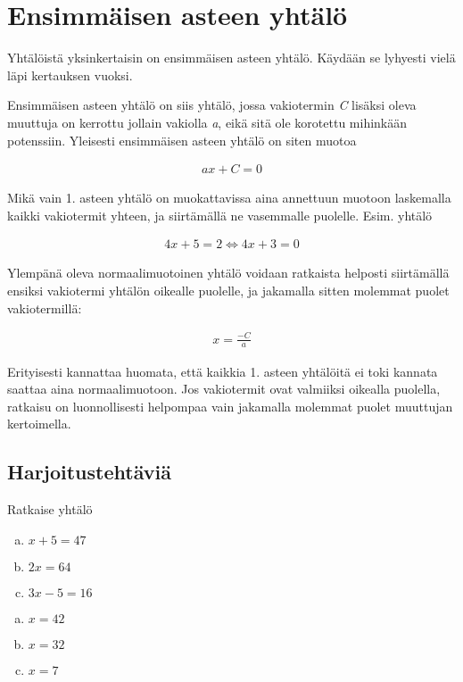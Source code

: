 \chapter{Ensimmäisen asteen yhtälö}

Yhtälöistä yksinkertaisin on ensimmäisen asteen yhtälö. Käydään se lyhyesti
vielä läpi kertauksen vuoksi.

Ensimmäisen asteen yhtälö on siis yhtälö, jossa vakiotermin \emph{C} lisäksi
oleva muuttuja on kerrottu jollain vakiolla \emph{a}, eikä sitä ole korotettu
mihinkään potenssiin. Yleisesti ensimmäisen asteen yhtälö on siten muotoa

\begin{align*}
    ax + C = 0
\end{align*}

Mikä vain 1. asteen yhtälö on muokattavissa aina
annettuun muotoon laskemalla kaikki vakiotermit yhteen,
ja siirtämällä ne vasemmalle puolelle. Esim. yhtälö

\begin{align*}
    4x + 5 = 2 \Leftrightarrow 4x + 3 = 0
\end{align*}

Ylempänä oleva normaalimuotoinen yhtälö voidaan ratkaista helposti siirtämällä
ensiksi vakiotermi yhtälön oikealle puolelle, ja jakamalla sitten molemmat puolet vakiotermillä:

\begin{align*}
    x = \frac{-C}{a}
\end{align*}

Erityisesti kannattaa huomata, että kaikkia 1. asteen yhtälöitä ei toki kannata
saattaa aina normaalimuotoon. Jos vakiotermit ovat valmiiksi oikealla puolella,
ratkaisu on luonnollisesti helpompaa vain jakamalla molemmat puolet muuttujan kertoimella.

\section{Harjoitustehtäviä}

\begin{tehtava}
  Ratkaise yhtälö
  \begin{enumerate}[a)]
    \item $x + 5 = 47$
    \item $2x = 64$
    \item $3x - 5 = 16$
  \end{enumerate}

  \begin{vastaus}
    \begin{enumerate}[a)]
      \item $x = 42$
      \item $x = 32$
      \item $x = 7$
    \end{enumerate}
  \end{vastaus}
\end{tehtava}

